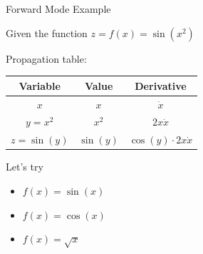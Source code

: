 \documentclass[12pt,xcolor={table}]{beamer}
\begin{document}
\begin{frame}{Forward Mode Example}

Given the function $z = f(x) = \sin(x^2)$

Propagation table:

\begin{center}
\begin{tabular}{c|c|c}
Variable & Value & Derivative \\
\hline
$x$ & $x$ & $\dot{x}$ \\
$y=x^2$ & $x^2$ & $2x\dot{x}$ \\
$z=\sin(y)$ & $\sin(y)$ & $\cos(y)\cdot 2x\dot{x}$
\end{tabular}
\end{center}

\begin{block}{Let's try}
\begin{itemize}
\item $f(x) = \sin(x)$
\item $f(x) = \cos(x)$
\item $f(x) = \sqrt{x}$
\end{itemize}
\end{block}

\end{frame}
\end{document}
